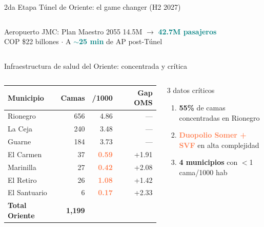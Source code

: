 \documentclass[aspectratio=169, 11pt]{beamer}
\newcommand{\highlight}[1]{\textcolor{teal}{\textbf{#1}}}
\newcommand{\danger}[1]{\textcolor{coral}{\textbf{#1}}}
\newcommand{\src}[1]{\par\vspace{2pt}{\tiny\textcolor{slate}{Fuente: #1}}}
\begin{document}
{\begin{frame}{2da Etapa Túnel de Oriente: el game changer (H2 2027)}
\begin{columns}[T]
\vspace{2pt}
\begin{exampleblock}{\small Aeropuerto JMC: Plan Maestro 2055}
\centering\footnotesize
14.5M $\to$ \highlight{42.7M pasajeros}\\
{\scriptsize COP \$22 billones $\cdot$ A \highlight{$\sim$25 min} de AP post-Túnel}
\end{exampleblock}
\end{columns}
\end{frame}
}


{
\begin{frame}{Infraestructura de salud del Oriente: concentrada y crítica}
\begin{columns}[T]
{\tiny\setlength{\tabcolsep}{3pt}
\begin{tabular}{@{}lrrr@{}}
\toprule
\textbf{Municipio} & \textbf{Camas} & \textbf{/1000} & \textbf{Gap OMS} \\
\midrule
\rowcolor{teal!6}
Rionegro & 656 & 4.86 & --- \\
La Ceja & 240 & 3.48 & --- \\
Guarne & 184 & 3.73 & --- \\
\rowcolor{coral!10}
El Carmen & 37 & \danger{0.59} & +1.91 \\
\rowcolor{coral!10}
Marinilla & 27 & \danger{0.42} & +2.08 \\
\rowcolor{coral!10}
El Retiro & 26 & \danger{1.08} & +1.42 \\
\rowcolor{coral!10}
El Santuario & 6 & \danger{0.17} & +2.33 \\
\midrule
\textbf{Total Oriente} & \textbf{1,199} & & \\
\bottomrule
\end{tabular}
}
\src{REPS capacidad instalada (b4dp-ximh), DANE est.\ 2026}

\begin{alertblock}{\small 3 datos críticos}
\scriptsize
\begin{enumerate}\setlength{\itemsep}{0pt}
  \item \textbf{55\%} de camas concentradas en Rionegro
  \item \danger{Duopolio Somer + SVF} en alta complejidad
  \item \textbf{4 municipios} con $<$1 cama/1000 hab
\end{enumerate}
\end{alertblock}


\end{columns}
\end{frame}}
\end{document}
